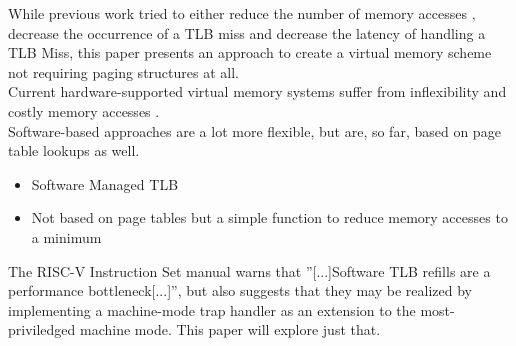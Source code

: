
While previous work tried to either reduce the number of memory accesses ,
decrease the occurrence of a TLB miss and decrease the latency of handling a TLB Miss, this paper
presents an approach to create a virtual memory scheme not requiring paging structures at all.\\


%






Current hardware-supported virtual memory systems suffer from inflexibility and costly memory accesses \cite{jacob1998look}.\\
Software-based approaches are a lot more flexible, but are, so far, based on page table lookups as well.


\begin{itemize}
    \item Software Managed TLB
    \item Not based on page tables but a simple function to reduce memory accesses to a minimum
\end{itemize}


The RISC-V Instruction Set manual warns that ''[...]Software TLB refills are a performance bottleneck[...]''\cite{RISCVInstructionSet},
but also suggests that they may be realized by implementing a machine-mode trap handler as an extension to the
most-priviledged machine mode. This paper will explore just that.


